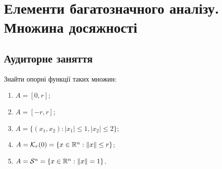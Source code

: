 
\section{Елементи багатозначного аналізу. Множина досяжності}

\subsection*{Аудиторне заняття}

\begin{problem}
\end{problem}

\begin{solution}
\end{solution}

\begin{problem}
\end{problem}

\begin{solution}
\end{solution}

\begin{problem}
	Знайти опорні функції таких множин:

	\begin{enumerate}
		\item $A = [0, r]$;

		\item $A = [-r, r]$;

		\item $A = \{ (x_1, x_2): |x_1| \le 1, |x_2| \le 2 \}$;

		\item $A = \mathcal{K}_r (0) = \{ x \in \mathbb{R}^n: \|x\| \le r \}$;

		\item $A = \mathcal{S}^n = \{ x \in \mathbb{R}^n: \|x\| = 1 \}$.
	\end{enumerate}
\end{problem}

